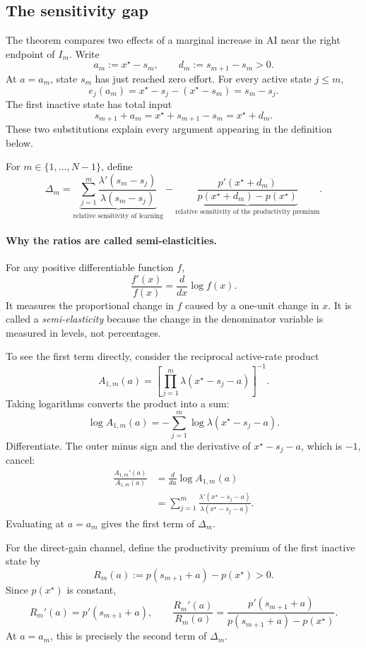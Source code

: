 \documentclass[11pt]{article}
\theoremstyle{tutorial}
\theoremstyle{remark}
\newcommand{\1}{\mathbb{I}}
\begin{document}
\subsection{The sensitivity gap}

The theorem compares two effects of a marginal increase in AI near the right endpoint of $I_m$.  Write
\[
  a_m:=x^\star-s_m,
  \qquad
  d_m:=s_{m+1}-s_m>0.
\]
At $a=a_m$, state $s_m$ has just reached zero effort.  For every active state $j\le m$,
\[
e_j(a_m)
=x^\star-s_j-(x^\star-s_m)
=s_m-s_j.
\]
The first inactive state has total input
\[
  s_{m+1}+a_m=x^\star+s_{m+1}-s_m=x^\star+d_m.
\]
These two substitutions explain every argument appearing in the definition below.

For $m\in\{1,\ldots,N-1\}$, define
\begin{equation}
\boxed{
\Delta_m=
\underbrace{\sum_{j=1}^m\frac{\lambda'(s_m-s_j)}{\lambda(s_m-s_j)}}_{
\text{relative sensitivity of learning}}
-
\underbrace{\frac{p'(x^\star+d_m)}
{p(x^\star+d_m)-p(x^\star)}}_{
\text{relative sensitivity of the productivity premium}}.}
\label{eq:sensitivity-gap}
\end{equation}

\paragraph{Why the ratios are called semi-elasticities.}
For any positive differentiable function $f$,
\[
  \frac{f'(x)}{f(x)}=\frac{d}{dx}\log f(x).
\]
It measures the proportional change in $f$ caused by a one-unit change in $x$.  It is called a
\emph{semi-elasticity} because the change in the denominator variable is measured in levels, not percentages.

To see the first term directly, consider the reciprocal active-rate product
\[
 A_{1,m}(a)=\left[\prod_{j=1}^m\lambda(x^\star-s_j-a)\right]^{-1}.
\]
Taking logarithms converts the product into a sum:
\[
 \log A_{1,m}(a)=-\sum_{j=1}^m\log\lambda(x^\star-s_j-a).
\]
Differentiate.  The outer minus sign and the derivative of $x^\star-s_j-a$, which is $-1$, cancel:
\begin{align*}
\frac{A_{1,m}'(a)}{A_{1,m}(a)}
&=\frac{d}{da}\log A_{1,m}(a)\\
&=\sum_{j=1}^m
\frac{\lambda'(x^\star-s_j-a)}{\lambda(x^\star-s_j-a)}.
\end{align*}
Evaluating at $a=a_m$ gives the first term of $\Delta_m$.

For the direct-gain channel, define the productivity premium of the first inactive state by
\[
  R_m(a):=p(s_{m+1}+a)-p(x^\star)>0.
\]
Since $p(x^\star)$ is constant,
\[
  R_m'(a)=p'(s_{m+1}+a),
  \qquad
  \frac{R_m'(a)}{R_m(a)}
  =\frac{p'(s_{m+1}+a)}{p(s_{m+1}+a)-p(x^\star)}.
\]
At $a=a_m$, this is precisely the second term of $\Delta_m$.
\end{document}
